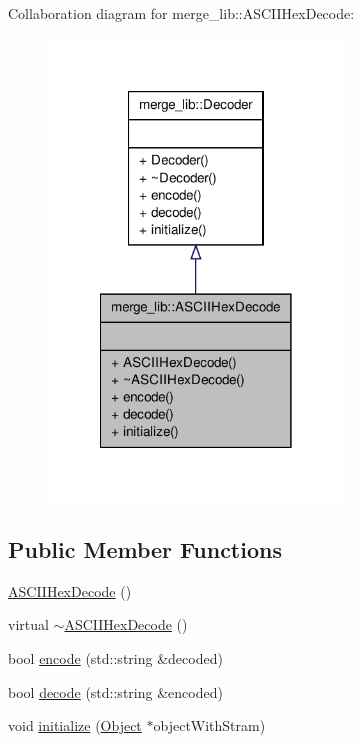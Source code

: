 Collaboration diagram for merge\-\_\-lib\-:\-:A\-S\-C\-I\-I\-Hex\-Decode\-:
\nopagebreak
\begin{figure}[H]
\begin{center}
\leavevmode
\includegraphics[width=222pt]{d8/dd2/classmerge__lib_1_1_a_s_c_i_i_hex_decode__coll__graph}
\end{center}
\end{figure}
\subsection*{Public Member Functions}
\begin{DoxyCompactItemize}
\item 
\hyperlink{classmerge__lib_1_1_a_s_c_i_i_hex_decode_aad567c6d9cb1187465e0bc9d3d8e1bd8}{A\-S\-C\-I\-I\-Hex\-Decode} ()
\item 
virtual \hyperlink{classmerge__lib_1_1_a_s_c_i_i_hex_decode_ac8e26551698b60f6e1cbb41de880f0a0}{$\sim$\-A\-S\-C\-I\-I\-Hex\-Decode} ()
\item 
bool \hyperlink{classmerge__lib_1_1_a_s_c_i_i_hex_decode_a2b58b5b934edd1274f4ccd186326e898}{encode} (std\-::string \&decoded)
\item 
bool \hyperlink{classmerge__lib_1_1_a_s_c_i_i_hex_decode_a858f422b0b4c92b1b8f7beb03d853e87}{decode} (std\-::string \&encoded)
\item 
void \hyperlink{classmerge__lib_1_1_a_s_c_i_i_hex_decode_a77420193909b078da0a553abb6fa5684}{initialize} (\hyperlink{classmerge__lib_1_1_object}{Object} $\ast$object\-With\-Stram)
\end{DoxyCompactItemize}



